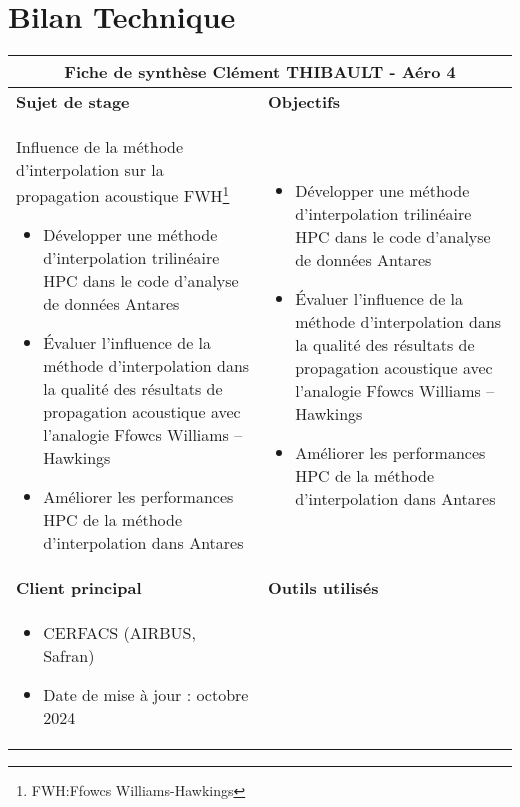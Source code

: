 \section*{Bilan Technique}
\begin{table}[ht]
\centering
\begin{tabular}{|p{8cm}|p{8cm}|}
\hline
\multicolumn{2}{|c|}{\textbf{Fiche de synthèse}   \hspace{7cm}   Clément THIBAULT - Aéro 4} \\ 
\hline
\textbf{Sujet de stage} & \textbf{Objectifs} \\ 
\hline
\begin{minipage}[t]{8cm}
Influence de la méthode d’interpolation sur la propagation acoustique FWH\footnote{FWH:Ffowcs Williams-Hawkings }
\begin{itemize}
    \item Développer une méthode d’interpolation trilinéaire HPC dans le code d’analyse de données Antares
    \item Évaluer l’influence de la méthode d’interpolation dans la qualité des résultats de propagation acoustique avec l’analogie Ffowcs Williams – Hawkings
    \item Améliorer les performances HPC de la méthode d’interpolation dans Antares
\end{itemize}
\end{minipage} & 
\begin{minipage}[t]{8cm}
\begin{itemize}
    \item Développer une méthode d’interpolation trilinéaire HPC dans le code d’analyse de données Antares
    \item Évaluer l’influence de la méthode d’interpolation dans la qualité des résultats de propagation acoustique avec l’analogie Ffowcs Williams – Hawkings
    \item Améliorer les performances HPC de la méthode d’interpolation dans Antares
\end{itemize}
\end{minipage} \\ 
\hline
\textbf{Client principal} & \textbf{Outils utilisés} \\ 
\hline
\begin{minipage}[t]{8cm}
\begin{itemize}
    \item CERFACS (AIRBUS, Safran)
    \item Date de mise à jour : octobre 2024

\end{itemize}
\end{minipage}
\end{tabular}
\end{table}

